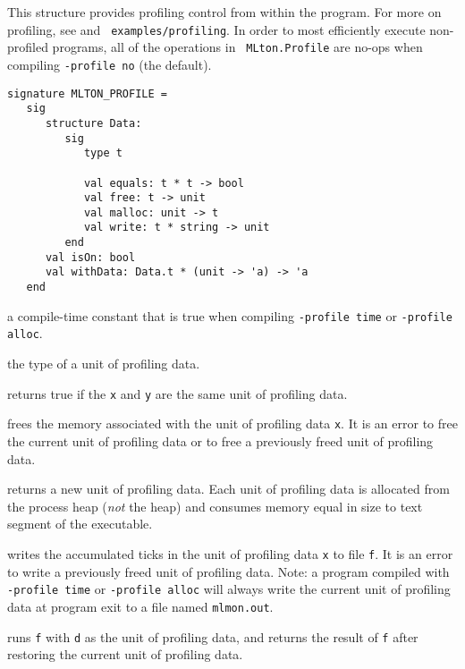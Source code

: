 This structure provides profiling control from within the program.
For more on profiling, see  and {\tt
examples/profiling}. In order to most efficiently execute
non-profiled programs, all of the operations in {\tt
MLton.Profile} are no-ops when compiling {\tt -profile no} (the
default).

\begin{verbatim}
signature MLTON_PROFILE =
   sig
      structure Data:
         sig
            type t

            val equals: t * t -> bool
            val free: t -> unit
            val malloc: unit -> t
            val write: t * string -> unit
         end
      val isOn: bool
      val withData: Data.t * (unit -> 'a) -> 'a
   end
\end{verbatim}

\begin{description}

a compile-time constant that is true when compiling {\tt -profile
time} or {\tt -profile alloc}.

 the type of a unit of profiling data.

returns true if the {\tt x} and {\tt y} are the same unit of profiling
data.

frees the memory associated with the unit of profiling data {\tt x}.
It is an error to free the current unit of profiling data or to free a
previously freed unit of profiling data.

returns a new unit of profiling data.  Each unit of profiling data is
allocated from the process heap (\emph{not} the {\mlton} heap) and
consumes memory equal in size to text segment of the executable.

writes the accumulated ticks in the unit of profiling data {\tt x} to
file {\tt f}.  It is an error to write a previously freed unit of
profiling data.  Note: a program compiled with {\tt -profile time} or
{\tt -profile alloc} will always write the current unit of profiling
data at program exit to a file named {\tt mlmon.out}.

runs {\tt f} with {\tt d} as the unit of profiling data, and returns
the result of {\tt f} after restoring the current unit of profiling
data.

\end{description}

